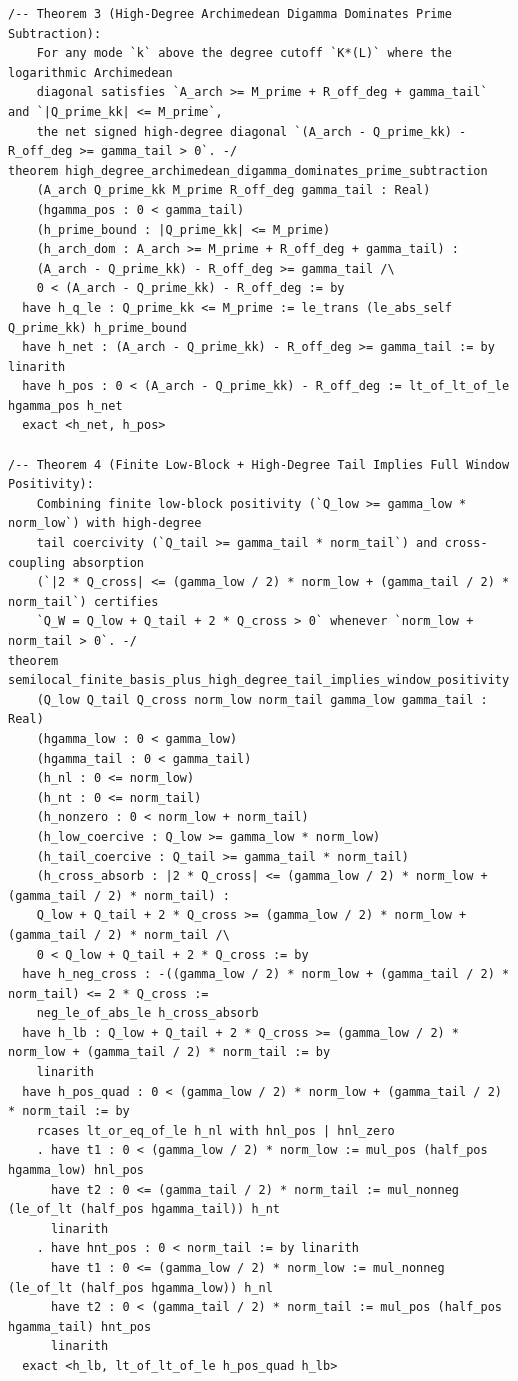 \documentclass[11pt,a4paper]{article}
\begin{document}
\begin{lstlisting}[language=Lean4]
/-- Theorem 3 (High-Degree Archimedean Digamma Dominates Prime Subtraction):
    For any mode `k` above the degree cutoff `K*(L)` where the logarithmic Archimedean
    diagonal satisfies `A_arch >= M_prime + R_off_deg + gamma_tail` and `|Q_prime_kk| <= M_prime`,
    the net signed high-degree diagonal `(A_arch - Q_prime_kk) - R_off_deg >= gamma_tail > 0`. -/
theorem high_degree_archimedean_digamma_dominates_prime_subtraction
    (A_arch Q_prime_kk M_prime R_off_deg gamma_tail : Real)
    (hgamma_pos : 0 < gamma_tail)
    (h_prime_bound : |Q_prime_kk| <= M_prime)
    (h_arch_dom : A_arch >= M_prime + R_off_deg + gamma_tail) :
    (A_arch - Q_prime_kk) - R_off_deg >= gamma_tail /\
    0 < (A_arch - Q_prime_kk) - R_off_deg := by
  have h_q_le : Q_prime_kk <= M_prime := le_trans (le_abs_self Q_prime_kk) h_prime_bound
  have h_net : (A_arch - Q_prime_kk) - R_off_deg >= gamma_tail := by linarith
  have h_pos : 0 < (A_arch - Q_prime_kk) - R_off_deg := lt_of_lt_of_le hgamma_pos h_net
  exact <h_net, h_pos>

/-- Theorem 4 (Finite Low-Block + High-Degree Tail Implies Full Window Positivity):
    Combining finite low-block positivity (`Q_low >= gamma_low * norm_low`) with high-degree
    tail coercivity (`Q_tail >= gamma_tail * norm_tail`) and cross-coupling absorption
    (`|2 * Q_cross| <= (gamma_low / 2) * norm_low + (gamma_tail / 2) * norm_tail`) certifies
    `Q_W = Q_low + Q_tail + 2 * Q_cross > 0` whenever `norm_low + norm_tail > 0`. -/
theorem semilocal_finite_basis_plus_high_degree_tail_implies_window_positivity
    (Q_low Q_tail Q_cross norm_low norm_tail gamma_low gamma_tail : Real)
    (hgamma_low : 0 < gamma_low)
    (hgamma_tail : 0 < gamma_tail)
    (h_nl : 0 <= norm_low)
    (h_nt : 0 <= norm_tail)
    (h_nonzero : 0 < norm_low + norm_tail)
    (h_low_coercive : Q_low >= gamma_low * norm_low)
    (h_tail_coercive : Q_tail >= gamma_tail * norm_tail)
    (h_cross_absorb : |2 * Q_cross| <= (gamma_low / 2) * norm_low + (gamma_tail / 2) * norm_tail) :
    Q_low + Q_tail + 2 * Q_cross >= (gamma_low / 2) * norm_low + (gamma_tail / 2) * norm_tail /\
    0 < Q_low + Q_tail + 2 * Q_cross := by
  have h_neg_cross : -((gamma_low / 2) * norm_low + (gamma_tail / 2) * norm_tail) <= 2 * Q_cross :=
    neg_le_of_abs_le h_cross_absorb
  have h_lb : Q_low + Q_tail + 2 * Q_cross >= (gamma_low / 2) * norm_low + (gamma_tail / 2) * norm_tail := by
    linarith
  have h_pos_quad : 0 < (gamma_low / 2) * norm_low + (gamma_tail / 2) * norm_tail := by
    rcases lt_or_eq_of_le h_nl with hnl_pos | hnl_zero
    . have t1 : 0 < (gamma_low / 2) * norm_low := mul_pos (half_pos hgamma_low) hnl_pos
      have t2 : 0 <= (gamma_tail / 2) * norm_tail := mul_nonneg (le_of_lt (half_pos hgamma_tail)) h_nt
      linarith
    . have hnt_pos : 0 < norm_tail := by linarith
      have t1 : 0 <= (gamma_low / 2) * norm_low := mul_nonneg (le_of_lt (half_pos hgamma_low)) h_nl
      have t2 : 0 < (gamma_tail / 2) * norm_tail := mul_pos (half_pos hgamma_tail) hnt_pos
      linarith
  exact <h_lb, lt_of_lt_of_le h_pos_quad h_lb>


\end{lstlisting}
\end{document}
